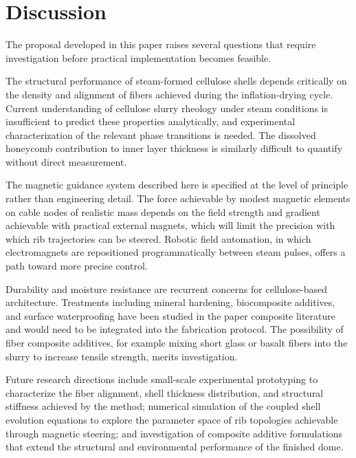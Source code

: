 \documentclass[12pt,a4paper]{article}
\begin{document}
\section{Discussion}

The proposal developed in this paper raises several questions that
require investigation before practical implementation becomes feasible.

The structural performance of steam-formed cellulose shells depends
critically on the density and alignment of fibers achieved during the
inflation-drying cycle. Current understanding of cellulose slurry
rheology under steam conditions is insufficient to predict these
properties analytically, and experimental characterization of the
relevant phase transitions is needed. The dissolved honeycomb
contribution to inner layer thickness is similarly difficult to
quantify without direct measurement.

The magnetic guidance system described here is specified at the level
of principle rather than engineering detail. The force achievable by
modest magnetic elements on cable nodes of realistic mass depends on
the field strength and gradient achievable with practical external
magnets, which will limit the precision with which rib trajectories
can be steered. Robotic field automation, in which electromagnets are
repositioned programmatically between steam pulses, offers a path
toward more precise control.

Durability and moisture resistance are recurrent concerns for
cellulose-based architecture. Treatments including mineral hardening,
biocomposite additives, and surface waterproofing have been studied in
the paper composite literature and would need to be integrated into
the fabrication protocol. The possibility of fiber composite additives,
for example mixing short glass or basalt fibers into the slurry to
increase tensile strength, merits investigation.

Future research directions include small-scale experimental prototyping
to characterize the fiber alignment, shell thickness distribution, and
structural stiffness achieved by the method; numerical simulation of
the coupled shell evolution equations to explore the parameter space of
rib topologies achievable through magnetic steering; and investigation
of composite additive formulations that extend the structural and
environmental performance of the finished dome.
\end{document}
